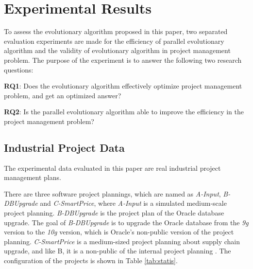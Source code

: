 %
%

\section{Experimental Results}
%
To assess the evolutionary algorithm proposed in this paper, two separated
evaluation experiments are made for the efficiency of parallel evolutionary
algorithm and the validity of evolutionary algorithm in project management
problem. The purpose of the experiment is to answer the following two research
questions:


\textbf{RQ1}: Does the evolutionary algorithm effectively optimize project
management problem, and get an optimized answer?

\textbf{RQ2}: Is the parallel evolutionary algorithm able to improve the
efficiency in the project management problem?


\subsection{Industrial Project Data}
%
The experimental data evaluated in this paper are real industrial project
management plans.


There are three software project plannings, which are named as \emph{A-Input},
\emph{B-DBUpgrade} and \emph{C-SmartPrice}, where \emph{A-Input} is a simulated
medium-scale project planning. \emph{B-DBUpgrade} is the project plan of the
Oracle database upgrade. The goal of \emph{B-DBUpgrade} is to upgrade the Oracle
database from the \emph{9g} version to the \emph{10g} version, which is Oracle's
non-public version of the project planning. \emph{C-SmartPrice} is a
medium-sized project planning about supply chain upgrade, and like B, it is a
non-public of the internal project planning \cite{ren}. The configuration of the
projects is shown in Table \ref{tab:statis}.

